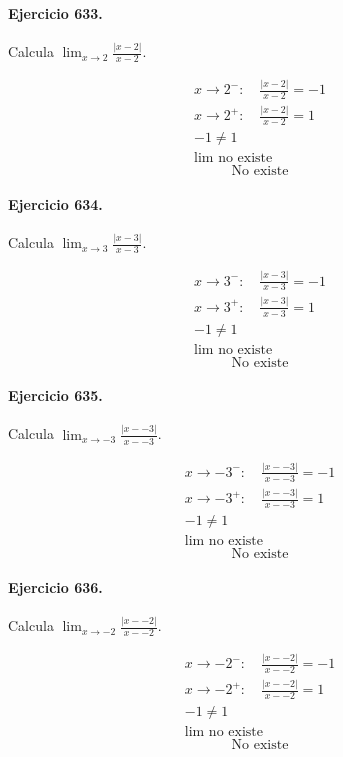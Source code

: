\documentclass[11pt,a4paper]{article}
\begin{document}
\paragraph{Ejercicio 633.} Calcula $\displaystyle\lim_{x\to 2}\frac{|x-2|}{x-2}$. 

\[
\begin{aligned}
x\to 2^-:\quad \frac{|x-2|}{x-2}=-1\\
x\to 2^+:\quad \frac{|x-2|}{x-2}=1\\
-1\ne1\\
\lim\text{{ no existe}}
\end{aligned}
\]
\[\boxed{\text{{No existe}}}\]


\paragraph{Ejercicio 634.} Calcula $\displaystyle\lim_{x\to 3}\frac{|x-3|}{x-3}$. 

\[
\begin{aligned}
x\to 3^-:\quad \frac{|x-3|}{x-3}=-1\\
x\to 3^+:\quad \frac{|x-3|}{x-3}=1\\
-1\ne1\\
\lim\text{{ no existe}}
\end{aligned}
\]
\[\boxed{\text{{No existe}}}\]


\paragraph{Ejercicio 635.} Calcula $\displaystyle\lim_{x\to -3}\frac{|x--3|}{x--3}$. 

\[
\begin{aligned}
x\to -3^-:\quad \frac{|x--3|}{x--3}=-1\\
x\to -3^+:\quad \frac{|x--3|}{x--3}=1\\
-1\ne1\\
\lim\text{{ no existe}}
\end{aligned}
\]
\[\boxed{\text{{No existe}}}\]


\paragraph{Ejercicio 636.} Calcula $\displaystyle\lim_{x\to -2}\frac{|x--2|}{x--2}$. 

\[
\begin{aligned}
x\to -2^-:\quad \frac{|x--2|}{x--2}=-1\\
x\to -2^+:\quad \frac{|x--2|}{x--2}=1\\
-1\ne1\\
\lim\text{{ no existe}}
\end{aligned}
\]
\[\boxed{\text{{No existe}}}\]
\end{document}
